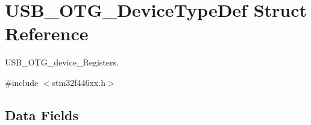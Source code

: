 \hypertarget{struct_u_s_b___o_t_g___device_type_def}{}\section{U\+S\+B\+\_\+\+O\+T\+G\+\_\+\+Device\+Type\+Def Struct Reference}
\label{struct_u_s_b___o_t_g___device_type_def}


U\+S\+B\+\_\+\+O\+T\+G\+\_\+device\+\_\+\+Registers.  




{\ttfamily \#include $<$stm32f446xx.\+h$>$}

\subsection*{Data Fields}
